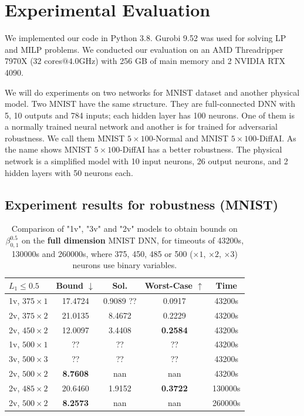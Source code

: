 \documentclass[letterpaper]{article} %
\begin{document}
	
	
	
	
	


	\section{Experimental Evaluation}
	
	We implemented our code in Python 3.8.
	Gurobi 9.52 was used for solving LP and MILP problems. We conducted our evaluation on an AMD Threadripper 7970X  ($32$ cores$@4.0$GHz) with 256 GB of main memory and 2 NVIDIA RTX 4090. 
	
	We will do experiments on two networks for MNIST dataset and another physical model. Two MNIST have the same structure. They are full-connected DNN with 5, 10 outputs and 784 inputs; each hidden layer has 100 neurons. One of them is a normally trained neural network and another is for trained for adversarial robustness. We call them MNIST $5\times100$-Normal and MNIST $5\times 100$-DiffAI. As the name shows MNIST $5\times 100$-DiffAI has a better robustness. The physical network is a simplified model with 10 input neurons, 26 output neurons, and 2 hidden layers with 50 neurons each.
	
	\subsection{Experiment results for robustness (MNIST)}
	

	
	\begin{table}[h!]
	\begin{tabular}{|l|c|c|c|c|}\hline\hline
		$L_1\leq 0.5$ &        Bound $\downarrow$ &  Sol. &      Worst-Case $\uparrow$ &  Time \\\hline \hline
		1v, $375 \times 1$ & 17.4724 & 0.9089  ?? & 0.0917 & 43200s \\\hline 
		2v, $375 \times 2$ & 21.0135 & 8.4672& 0.2229 & 43200s \\\hline		
		2v, $450 \times 2$ & 12.0097 & 3.4408 & {\bf 0.2584} & 43200s \\\hline
		1v, $500 \times 1$ & ?? & ?? & ?? & 43200s \\\hline 
		3v, $500 \times 3$ & ?? & ?? & ?? & 43200s \\\hline 
	 2v, $500 \times 2$ & {\bf 8.7608} & nan & nan & 43200s \\\hline\hline

	 2v, $485 \times 2$ & 20.6460 & 1.9152 & {\bf 0.3722} & 130000s \\\hline\hline

		 2v, $500 \times 2$ & {\bf 8.2573} & nan & nan & 260000s \\\hline\hline
		 
	\end{tabular}
	\caption{Comparison of "1v", "3v" and "2v" models 
	to obtain bounds on $\beta^{0.5}_{0,1}$ on the {\bf full dimension} MNIST DNN, for timeouts of 43200s, 130000s and 260000s, where 375, 450, 485 or 500 ($\times 1$, $\times 2$, $\times 3$) neurons use binary variables.}
\end{table}
\end{document}
